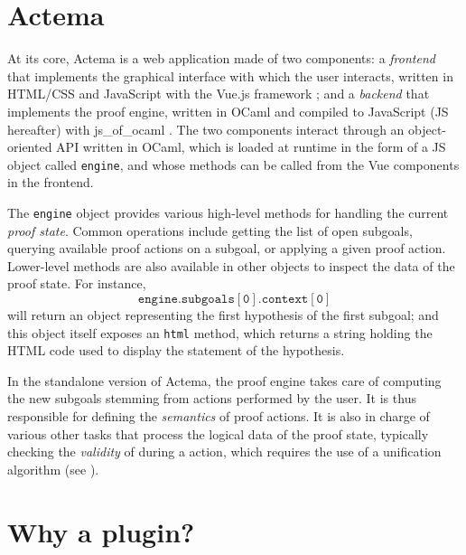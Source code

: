 \section{Actema}

At its core, Actema is a web application made of two components: a
\emph{frontend} that implements the graphical interface with which the user
interacts, written in HTML/CSS and JavaScript with the Vue.js framework
; and a \emph{backend} that implements the proof engine, written in
OCaml and compiled to JavaScript (JS hereafter) with js\_of\_ocaml
. The two components interact through an
object-oriented API written in OCaml, which is loaded at runtime in the form of
a JS object called \texttt{engine}, and whose methods can be called from the Vue
components in the frontend.

The \texttt{engine} object provides various high-level methods for handling the
current \emph{proof state}. Common operations include getting the list of open
subgoals, querying available proof actions on a subgoal, or applying a given
proof action. Lower-level methods are also available in other objects to inspect
the data of the proof state. For instance,
$$\mathtt{engine.subgoals[0].context[0]}$$
will return an object representing the first hypothesis of the first subgoal;
and this object itself exposes an \texttt{html} method, which returns a string
holding the HTML code used to display the statement of the hypothesis.


In the standalone version of Actema, the proof engine takes care of computing
the new subgoals stemming from actions performed by the user. It is thus
responsible for defining the \emph{semantics} of proof actions. It is also in
charge of various other tasks that process the logical data of the proof state,
typically checking the \emph{validity} of  during a  action, which
requires the use of a unification algorithm (see ).

\section{Why a plugin?}

